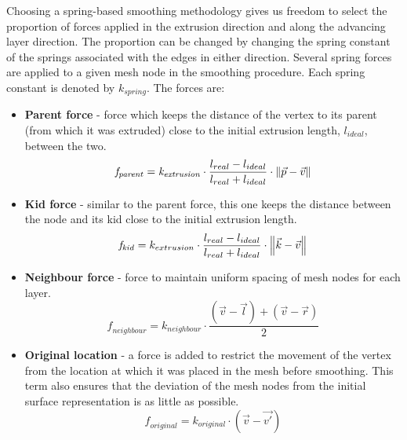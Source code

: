Choosing a spring-based smoothing methodology gives us freedom to select the proportion of forces applied in the extrusion direction and along the advancing layer direction. The proportion can be changed by changing the spring constant of the springs associated with the edges in either direction. Several spring forces are applied to a given mesh node in the smoothing procedure. Each spring constant is denoted by $k_{spring}$. The forces are:


\begin{itemize}
	\item \textbf{Parent force} - force which keeps the distance of the vertex to its parent (from which it was extruded) close to the initial extrusion length, $\mathit{l_{ideal}}$, between the two.
	\begin{equation}
	\mathit{f_{parent}} = \mathit{k_{extrusion}} \cdot \frac{l_{real} - l_{ideal}}{l_{real} + l_{ideal}} \cdot \left\lVert \vec{p} - \vec{v}\right\rVert
	\end{equation}
	\item \textbf{Kid force} - similar to the parent force, this one keeps the distance between the node and its kid close to the initial extrusion length.
	\begin{equation}
	\mathit{f_{kid}} = k_{extrusion} \cdot \frac{l_{real} - l_{ideal}}{l_{real} + l_{ideal}} \cdot \left\lVert\vec{k} - \vec{v}\right\rVert
	\end{equation}
	\item \textbf{Neighbour force} - force to maintain uniform spacing of mesh nodes for each layer.
	\begin{equation}
	\mathit{f_{neighbour}} = k_{neighbour} \cdot \frac{(\vec{v} - \vec{l}) + (\vec{v}- \vec{r})}{ 2}
	\end{equation}
	\item \textbf{Original location} - a force is added to restrict the movement of the vertex from the location at which it was placed in the mesh before smoothing. This term also ensures that the deviation of the mesh nodes from the initial surface representation is as little as possible.
	\begin{equation}
	\mathit{f_{original}} = k_{original} \cdot (\vec{v}- \vec{v'})
	\end{equation}
\end{itemize}

